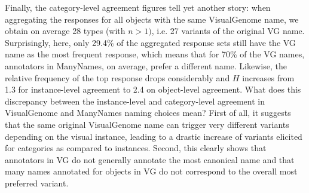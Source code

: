 Finally, the category-level agreement figures tell yet another story: when aggregating the responses for all objects with the same VisualGenome name, we obtain on average 28 types (with $n > 1)$, i.e. 27 variants of the original VG name. Surprisingly, here, only 29.4\% of the aggregated response sets still have the VG name as the most frequent response, which means that for 70\% of the VG names, annotators in ManyNames, on average, prefer a different name.  Likewise, the relative frequency of the top response drops considerably and $H$ increases from 1.3 for instance-level agreement to 2.4 on object-level agreement.  
What does this discrepancy between the instance-level and category-level agreement in VisualGenome and ManyNames naming choices mean? First of all, it suggests that the same original VisualGenome name can trigger very different variants depending on the visual instance, leading to a drastic increase of variants elicited for categories as compared to instances.
Second, this clearly shows that annotators in VG do not generally annotate the most canonical name and that many names annotated for objects in VG do not correspond to the overall most preferred variant. 

